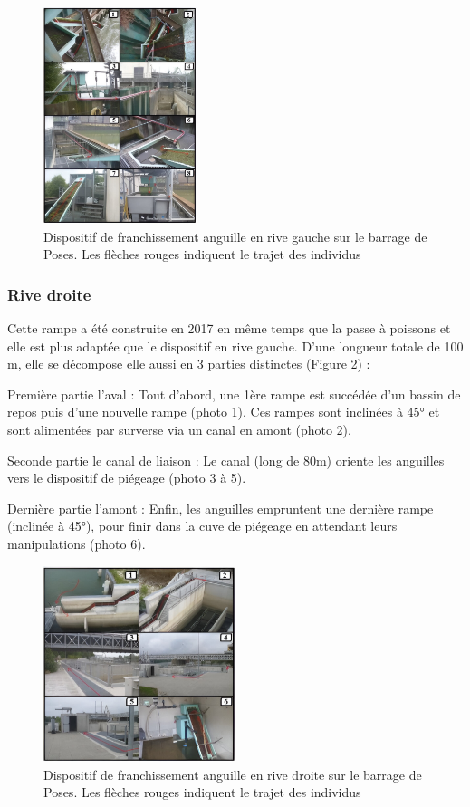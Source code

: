 \documentclass[11pt,titlepage,twoside]{article}\usepackage[]{graphicx}\usepackage[table]{xcolor}
\begin{document}
\begin{figure}[htpb]
\centering
\includegraphics[width=0.4\textwidth]{RG2}
\caption{Dispositif de franchissement anguille en rive gauche sur le barrage de Poses. Les flèches rouges indiquent le trajet des individus}
\label{RG2}
\end{figure}

\subsubsection{Rive droite }

Cette rampe a été construite en 2017 en même temps que la passe à poissons et elle est plus adaptée que le dispositif en rive gauche. D’une longueur totale de 100 m, elle se décompose elle aussi en 3 parties distinctes (Figure \ref{RD2}) :

Première partie l’aval : Tout d’abord, une 1ère rampe est succédée d’un bassin de repos puis d’une nouvelle rampe (photo 1). Ces rampes sont inclinées à 45° et sont alimentées par surverse via un canal en amont (photo 2).

Seconde partie le canal de liaison : Le canal (long de 80m) oriente les anguilles vers le dispositif de piégeage (photo 3 à 5). 

Dernière partie l’amont :  Enfin, les anguilles empruntent une dernière rampe (inclinée à 45°), pour finir dans la cuve de piégeage en attendant leurs manipulations (photo 6).

\begin{figure}[htpb]
\centering
\includegraphics[width=0.5\textwidth]{RD2}
\caption{Dispositif de franchissement anguille en rive droite sur le barrage de Poses. Les flèches rouges indiquent le trajet des individus}
\label{RD2}
\end{figure}
\end{document}
